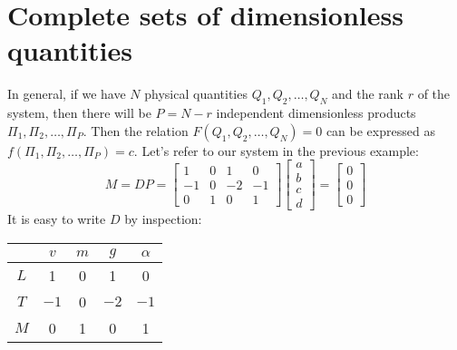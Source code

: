 \documentclass{report}
\begin{document}
\section{Complete sets of dimensionless quantities}
In general, if we have $N$ physical quantities $Q_1, Q_2, \ldots, Q_N$ and the rank $r$ of the system, then there will be $P = N-r$ independent dimensionless products $\Pi_1, \Pi_2, \ldots, \Pi_P$. Then the relation $F(Q_1, Q_2, \ldots, Q_N) = 0$ can be expressed as $f(\Pi_1, \Pi_2, \ldots, \Pi_P) = c$. Let's refer to our system in the previous example:
$$
M= DP =
  \begin{bmatrix}
    1 & 0 & 1 & 0 \\
    -1 & 0 & -2 & -1 \\
    0 & 1 & 0 & 1
  \end{bmatrix}
    \begin{bmatrix}
    a\\b\\c\\d
  \end{bmatrix}
  =
    \begin{bmatrix}
    0\\0\\0
  \end{bmatrix}
$$
It is easy to write $D$ by inspection:
\begin{center}

\begin{tabular}{c|cccc}
 & $v$&$m$&$g$&$\alpha$\\\hline
 $L$ & 1 & 0 & 1 & 0 \\
   $T$ & $-1$ & 0 & $-2$ & $-1$ \\
  $M$ &  0 & 1 & 0 & 1
\end{tabular}

\end{center}
\end{document}
